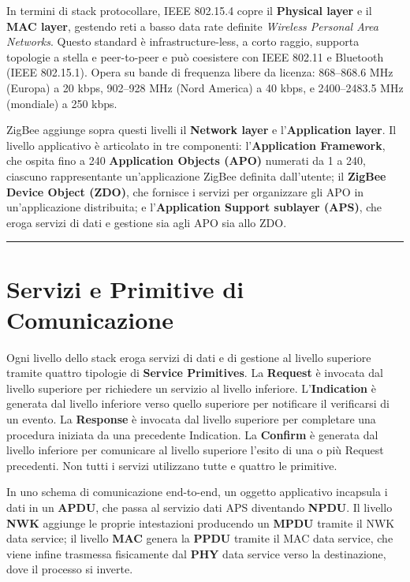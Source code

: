\documentclass[
  italian,
  openany]{book}
\begin{document}
In termini di stack protocollare, IEEE 802.15.4 copre il
\textbf{Physical layer} e il \textbf{MAC layer}, gestendo reti a basso
data rate definite \emph{Wireless Personal Area Networks}. Questo
standard è infrastructure-less, a corto raggio, supporta topologie a
stella e peer-to-peer e può coesistere con IEEE 802.11 e Bluetooth (IEEE
802.15.1). Opera su bande di frequenza libere da licenza: 868--868.6 MHz
(Europa) a 20 kbps, 902--928 MHz (Nord America) a 40 kbps, e
2400--2483.5 MHz (mondiale) a 250 kbps.

ZigBee aggiunge sopra questi livelli il \textbf{Network layer} e
l'\textbf{Application layer}. Il livello applicativo è articolato in tre
componenti: l'\textbf{Application Framework}, che ospita fino a 240
\textbf{Application Objects (APO)} numerati da 1 a 240, ciascuno
rappresentante un'applicazione ZigBee definita dall'utente; il
\textbf{ZigBee Device Object (ZDO)}, che fornisce i servizi per
organizzare gli APO in un'applicazione distribuita; e
l'\textbf{Application Support sublayer (APS)}, che eroga servizi di dati
e gestione sia agli APO sia allo ZDO.

\begin{center}\rule{0.5\linewidth}{0.5pt}\end{center}

\section{Servizi e Primitive di
Comunicazione}\label{servizi-e-primitive-di-comunicazione}

Ogni livello dello stack eroga servizi di dati e di gestione al livello
superiore tramite quattro tipologie di \textbf{Service Primitives}. La
\textbf{Request} è invocata dal livello superiore per richiedere un
servizio al livello inferiore. L'\textbf{Indication} è generata dal
livello inferiore verso quello superiore per notificare il verificarsi
di un evento. La \textbf{Response} è invocata dal livello superiore per
completare una procedura iniziata da una precedente Indication. La
\textbf{Confirm} è generata dal livello inferiore per comunicare al
livello superiore l'esito di una o più Request precedenti. Non tutti i
servizi utilizzano tutte e quattro le primitive.

In uno schema di comunicazione end-to-end, un oggetto applicativo
incapsula i dati in un \textbf{APDU}, che passa al servizio dati APS
diventando \textbf{NPDU}. Il livello \textbf{NWK} aggiunge le proprie
intestazioni producendo un \textbf{MPDU} tramite il NWK data service; il
livello \textbf{MAC} genera la \textbf{PPDU} tramite il MAC data
service, che viene infine trasmessa fisicamente dal \textbf{PHY} data
service verso la destinazione, dove il processo si inverte.
\end{document}
